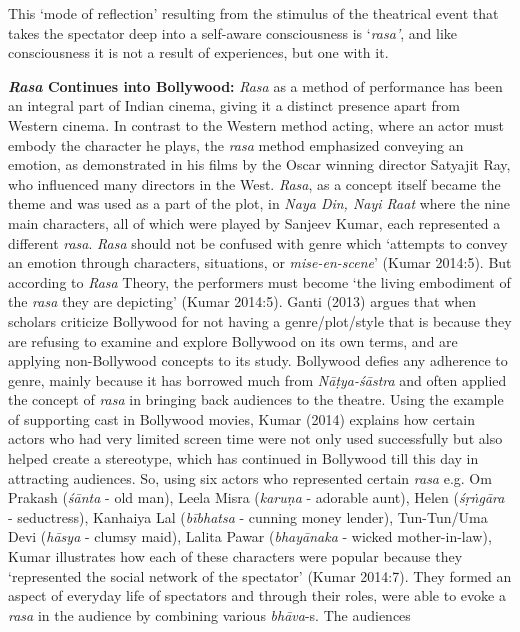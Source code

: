 This ‘mode of reflection’ resulting from the stimulus of the theatrical event that takes the spectator deep into a self-aware consciousness is ‘\textsl{rasa’}, and like consciousness it is not a result of experiences, but one with it.

\textbf{\textsl{Rasa} Continues into Bollywood:} \textsl{Rasa} as a method of performance has been an integral part of Indian cinema, giving it a distinct presence apart from Western cinema. In contrast to the Western method acting, where an actor must embody the character he plays, the \textsl{rasa} method emphasized conveying an emotion, as demonstrated in his films by the Oscar winning director Satyajit Ray, who influenced many directors in the West. \textsl{Rasa}, as a concept itself became the theme and was used as a part of the plot, in \textsl{Naya Din, Nayi Raat} where the nine main characters, all of which were played by Sanjeev Kumar, each represented a different \textsl{rasa}. \textsl{Rasa} should not be confused with genre which ‘attempts to convey an emotion through characters, situations, or \textsl{mise-en-scene}’ (Kumar 2014:5). But according to \textsl{Rasa} Theory, the performers must become ‘the living embodiment of the \textsl{rasa} they are depicting’ (Kumar 2014:5). Ganti (2013) argues that when scholars criticize Bollywood for not having a genre/plot/style that is because they are refusing to examine and explore Bollywood on its own terms, and are applying non-Bollywood concepts to its study. Bollywood defies any adherence to genre, mainly because it has borrowed much from \textsl{Nāṭya-śāstra} and often applied the concept of \textsl{rasa} in bringing back audiences to the theatre. Using the example of supporting cast in Bollywood movies, Kumar (2014) explains how certain actors who had very limited screen time were not only used successfully but also helped create a stereotype, which has continued in Bollywood till this day in attracting audiences. So, using six actors who represented certain \textsl{rasa} e.g. Om Prakash (\textsl{śānta} - old man), Leela Misra (\textsl{karuṇa} - adorable aunt), Helen (\textsl{śṛṅgāra} - seductress), Kanhaiya Lal (\textsl{bībhatsa} - cunning money lender), Tun-Tun/Uma Devi (\textsl{hāsya} - clumsy maid), Lalita Pawar (\textsl{bhayānaka} - wicked mother-in-law), Kumar illustrates how each of these characters were popular because they ‘represented the social network of the spectator’ (Kumar 2014:7). They formed an aspect of everyday life of spectators and through their roles, were able to evoke a \textsl{rasa} in the audience by combining various \textsl{bhāva}-s. The audiences 